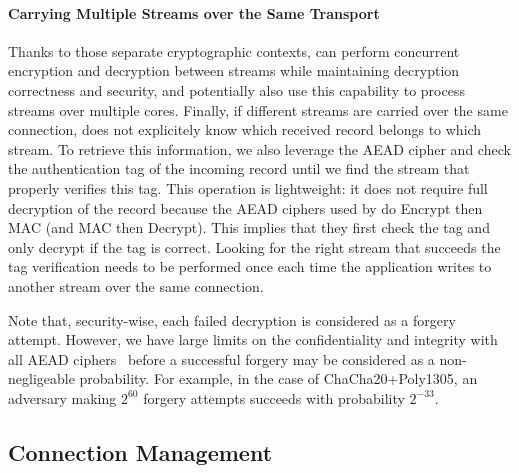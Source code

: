 \paragraph*{Carrying Multiple Streams over the Same Transport}
Thanks to those separate cryptographic contexts, \tcpls can perform concurrent
encryption and decryption between streams while maintaining decryption
correctness and security, and potentially also use this capability to process
streams over multiple cores. Finally, if different streams are carried
over the same \tcp connection, \tcpls does not explicitely know which
received record belongs to which stream. To retrieve this information,
we also
leverage the AEAD cipher and check the authentication tag of the incoming record
until we find the stream that properly verifies this tag. This operation is
lightweight: it does not require full decryption of the record because the AEAD
ciphers used by  do Encrypt then MAC (and MAC then Decrypt). This
implies that they first check the tag and only decrypt if the tag is correct.
Looking for the right stream that succeeds the tag verification needs to be
performed once each time the application writes to another stream over the same
\tcp connection.

Note that, security-wise, each failed decryption is considered as a
forgery attempt. However, we have large limits on the confidentiality and
integrity with all AEAD ciphers~\cite{luykx2015limits, aeadlimits} before a
successful forgery may be considered as a non-negligeable probability. For
example, in the case of ChaCha20+Poly1305, an adversary making $2^{60}$ forgery
attempts succeeds with probability $2^{-33}$.



\subsection{Connection Management}\label{sec:multipath}

